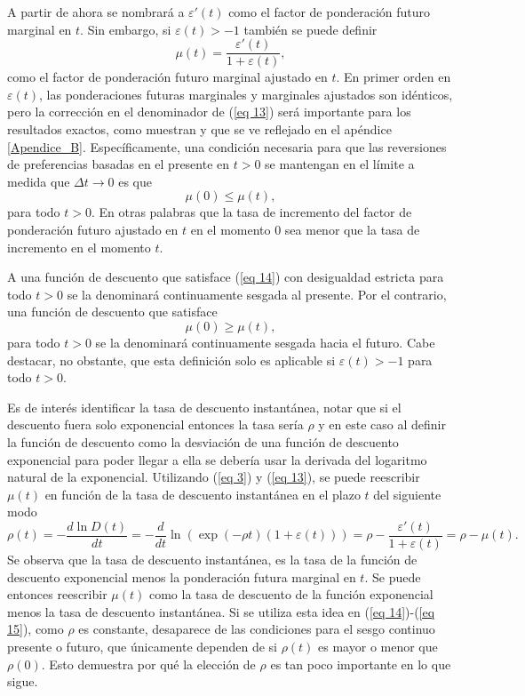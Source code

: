 A partir de ahora se nombrará a  $\varepsilon'(t)$ como el factor de ponderación futuro marginal en $t$. Sin embargo, si $\varepsilon(t) > -1$ también se puede definir
\begin{equation}
\label{eq 13}
    \mu(t)= \dfrac{\varepsilon'(t)}{1+\varepsilon(t)},
\end{equation}
como el factor de ponderación futuro marginal ajustado en $t$. En primer orden en $\varepsilon(t)$, las ponderaciones futuras marginales y marginales ajustados son idénticos, pero la corrección en el denominador de (\ref{eq 13}) será importante para los resultados exactos, como muestran \parencite{feigenbaum2021deviation} y que se ve reflejado en el apéndice \ref{Apendice_B}. Específicamente, una condición necesaria para que las reversiones de preferencias basadas en el presente en $t > 0$ se mantengan en el límite a medida que $\Delta t \rightarrow 0$ es que
\begin{equation}
\label{eq 14}
    \mu(0) \leq \mu(t),
\end{equation}
para todo $t>0$. En otras palabras que la tasa de incremento del factor de ponderación futuro ajustado en $t$ en el momento 0 sea menor que  la tasa de incremento en el momento $t$.

A una función de descuento que satisface (\ref{eq 14}) con desigualdad estricta para todo $t > 0$ se la denominará continuamente sesgada al presente. Por el contrario, una función de descuento que satisface
\begin{equation}
\label{eq 15}
    \mu(0) \geq \mu(t),
\end{equation}
para todo $t > 0$ se la denominará continuamente sesgada hacia el futuro. Cabe destacar, no obstante, que esta definición solo es aplicable si $\varepsilon(t) > -1$ para todo $t>0$.
 
Es de interés identificar la tasa de descuento instantánea, notar que si el descuento fuera solo exponencial entonces la tasa sería $\rho$ y en este caso al definir la función de descuento como la desviación de una función de descuento exponencial para poder llegar a ella se debería usar la derivada del logaritmo natural de la exponencial.  Utilizando (\ref{eq 3}) y (\ref{eq 13}), se puede reescribir $\mu(t)$ en función de la tasa de descuento instantánea en el plazo $t$ del siguiente modo 
%
\begin{equation}
\label{eq 16}
\rho(t)= - \dfrac{d \ln D(t)}{dt} =- \dfrac{d}{dt} \ln(\exp(- \rho t)(1+\varepsilon(t))) =\rho - \dfrac{\varepsilon'(t)}{1+ \varepsilon(t)} = \rho - \mu(t).
\end{equation}
Se observa que la tasa de descuento instantánea, es la tasa de la función de descuento exponencial menos la ponderación futura marginal en $t$. Se puede entonces reescribir $\mu(t)$ como la tasa de descuento de la función exponencial menos la tasa de descuento instantánea. Si se utiliza esta idea en (\ref{eq 14})-(\ref{eq 15}), como $\rho$ es constante, desaparece de las condiciones para el sesgo continuo presente o futuro, que únicamente dependen de si $\rho(t)$ es mayor o menor que $\rho(0)$. Esto demuestra por qué la elección de $\rho$ es tan poco importante en lo que sigue. 


